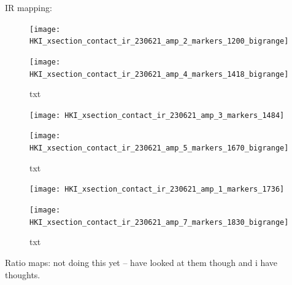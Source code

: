 IR mapping:

\begin{figure}[H]
\centering
\begin{minipage}{.45\textwidth}
  \centering
  \texttt{[image: HKI\_xsection\_contact\_ir\_230621\_amp\_2\_markers\_1200\_bigrange]}
\end{minipage}
\begin{minipage}{.45\textwidth}
  \centering
  \texttt{[image: HKI\_xsection\_contact\_ir\_230621\_amp\_4\_markers\_1418\_bigrange]}
\end{minipage}
\caption[txt]{txt}
\label{fig:afm_xsection_irmaps_1200_1418}
\end{figure}

\begin{figure}[H]
\centering
\begin{minipage}{.45\textwidth}
  \centering
  \texttt{[image: HKI\_xsection\_contact\_ir\_230621\_amp\_3\_markers\_1484]}
\end{minipage}
\begin{minipage}{.45\textwidth}
  \centering
  \texttt{[image: HKI\_xsection\_contact\_ir\_230621\_amp\_5\_markers\_1670\_bigrange]}
\end{minipage}
\caption[txt]{txt}
\label{fig:afm_xsection_irmaps_1484_1670}
\end{figure}

\begin{figure}[H]
\centering
\begin{minipage}{.45\textwidth}
  \centering
  \texttt{[image: HKI\_xsection\_contact\_ir\_230621\_amp\_1\_markers\_1736]}
\end{minipage}
\begin{minipage}{.45\textwidth}
  \centering
  \texttt{[image: HKI\_xsection\_contact\_ir\_230621\_amp\_7\_markers\_1830\_bigrange]}
\end{minipage}
\caption[txt]{txt}
\label{fig:afm_xsection_irmaps_1736_1830}
\end{figure}

Ratio maps: not doing this yet -- have looked at them though and i have thoughts.


